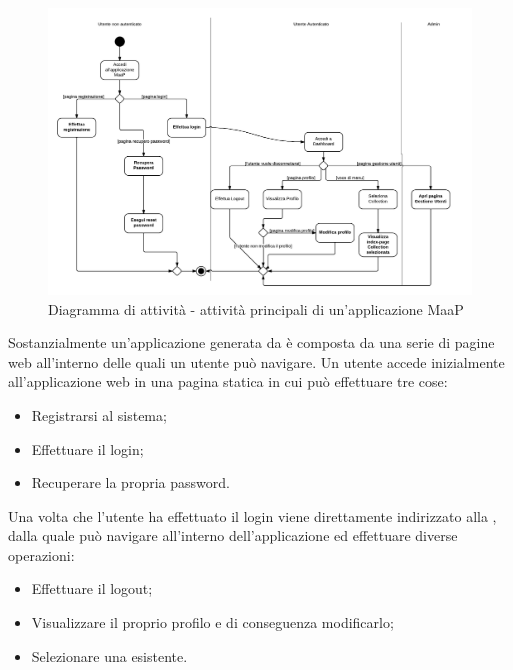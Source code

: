 \begin{figure}[H]
\centering
\includegraphics[scale=0.3]{uml/attivita/MaaP - Attivita principali.png}
\caption{Diagramma di attività - attività principali di un'applicazione MaaP}
\end{figure}

Sostanzialmente un'applicazione generata da  è composta da una serie di pagine web all'interno delle quali un utente può navigare. Un utente accede inizialmente all'applicazione web in una pagina statica in cui può effettuare tre cose:

\begin{itemize}

	\item Registrarsi al sistema;
	\item Effettuare il login;
	\item Recuperare la propria password.

\end{itemize}

Una volta che l'utente ha effettuato il login viene direttamente indirizzato alla , dalla quale può navigare all'interno dell'applicazione ed effettuare diverse operazioni:

\begin{itemize}

	\item Effettuare il logout;
	\item Visualizzare il proprio profilo e di conseguenza modificarlo;
	\item Selezionare una  esistente.

\end{itemize}

